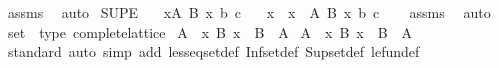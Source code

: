 \begin{isabellebody}
\isamarkupfalse%
\ assms\ \isamarkupfalse%
\ auto%
\endisatagproof
{\isafoldproof}%
%
\isadelimproof
\isanewline
%
\endisadelimproof
\isanewline
{}\isamarkupfalse%
\ SUP{}{\isacharunderscore}{\kern0pt}E{\isacharcolon}{\kern0pt}\isanewline
\ \ \ {\isachardoublequoteopen}{\isacharparenleft}{\kern0pt}{\isasymSqunion}x{\isasymin}A{\isachardot}{\kern0pt}\ B\ x{\isacharparenright}{\kern0pt}\ b\ c{\isachardoublequoteclose}\isanewline
\ \ \ x\ \ {\isachardoublequoteopen}x\ {\isasymin}\ A{\isachardoublequoteclose}\ {\isachardoublequoteopen}B\ x\ b\ c{\isachardoublequoteclose}\isanewline
%
\isadelimproof
\ \ %
\endisadelimproof
%
\isatagproof
{}\isamarkupfalse%
\ assms\ \isamarkupfalse%
\ auto%
\endisatagproof
{\isafoldproof}%
%
\isadelimproof
%
\endisadelimproof
%
\isadelimdocument
%
\endisadelimdocument
%
\isatagdocument
%
\isamarkuptrue%
%
\endisatagdocument
{\isafolddocument}%
%
\isadelimdocument
%
\endisadelimdocument
{}\isamarkupfalse%
\ {\isachardoublequoteopen}set{\isachardoublequoteclose}\ {\isacharcolon}{\kern0pt}{\isacharcolon}{\kern0pt}\ {\isacharparenleft}{\kern0pt}type{\isacharparenright}{\kern0pt}\ complete{\isacharunderscore}{\kern0pt}lattice\isanewline
{}\isanewline
\isanewline
{}\isamarkupfalse%
\ {\isachardoublequoteopen}{\isasymSqinter}A\ {\isacharequal}{\kern0pt}\ {\isacharbraceleft}{\kern0pt}x{\isachardot}{\kern0pt}\ {\isasymSqinter}{\isacharparenleft}{\kern0pt}{\isacharparenleft}{\kern0pt}{\isasymlambda}B{\isachardot}{\kern0pt}\ x\ {\isasymin}\ B{\isacharparenright}{\kern0pt}\ {\isacharbackquote}{\kern0pt}\ A{\isacharparenright}{\kern0pt}{\isacharbraceright}{\kern0pt}{\isachardoublequoteclose}\isanewline
\isanewline
{}\isamarkupfalse%
\ {\isachardoublequoteopen}{\isasymSqunion}A\ {\isacharequal}{\kern0pt}\ {\isacharbraceleft}{\kern0pt}x{\isachardot}{\kern0pt}\ {\isasymSqunion}{\isacharparenleft}{\kern0pt}{\isacharparenleft}{\kern0pt}{\isasymlambda}B{\isachardot}{\kern0pt}\ x\ {\isasymin}\ B{\isacharparenright}{\kern0pt}\ {\isacharbackquote}{\kern0pt}\ A{\isacharparenright}{\kern0pt}{\isacharbraceright}{\kern0pt}{\isachardoublequoteclose}\isanewline
\isanewline
{}\isamarkupfalse%
\isanewline
%
\isadelimproof
\ \ %
\endisadelimproof
%
\isatagproof
{}\isamarkupfalse%
\ standard\ {\isacharparenleft}{\kern0pt}auto\ simp\ add{\isacharcolon}{\kern0pt}\ less{\isacharunderscore}{\kern0pt}eq{\isacharunderscore}{\kern0pt}set{\isacharunderscore}{\kern0pt}def\ Inf{\isacharunderscore}{\kern0pt}set{\isacharunderscore}{\kern0pt}def\ Sup{\isacharunderscore}{\kern0pt}set{\isacharunderscore}{\kern0pt}def\ le{\isacharunderscore}{\kern0pt}fun{\isacharunderscore}{\kern0pt}def{\isacharparenright}{\kern0pt}%

\end{isabellebody}
